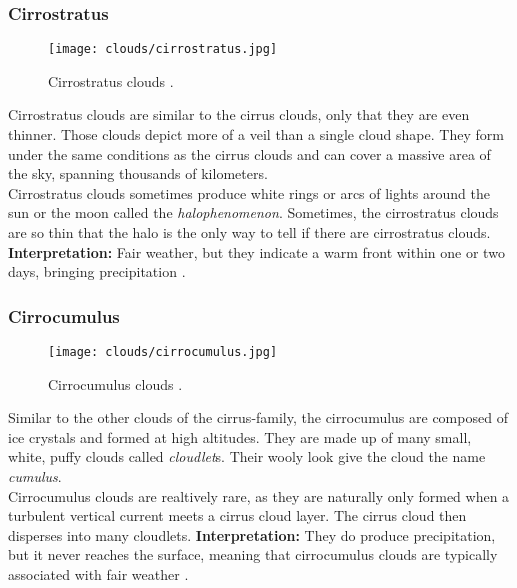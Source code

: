 \subsubsection{Cirrostratus}
\begin{wrapfigure}[10]{r}{6cm}
    \vspace{-\baselineskip}
    \texttt{[image: clouds/cirrostratus.jpg]}
    \caption{Cirrostratus clouds \protect\cite{cloudtypes:wiki:cirrostratus}.}
    \label{img:clouds:cirrostratus}
\end{wrapfigure}
Cirrostratus clouds are similar to the cirrus clouds, only that they are even thinner.
Those clouds depict more of a veil than a single cloud shape.
They form under the same conditions as the cirrus clouds and can cover a massive area of the sky, spanning thousands of kilometers.
\\
\noindent
Cirrostratus clouds sometimes produce white rings or arcs of lights around the sun or the moon called the \emph{\gls{halophenomenon}}.
Sometimes, the cirrostratus clouds are so thin that the halo is the only way to tell if there are cirrostratus clouds.
\emptyline
\textbf{Interpretation:} Fair weather, but they indicate a warm front within one or two days, bringing \gls{precipitation} \cite{cloudtypes:meteoblue}.

\subsubsection{Cirrocumulus}
\begin{wrapfigure}[10]{r}{6cm}
    \vspace{-\baselineskip}
    \texttt{[image: clouds/cirrocumulus.jpg]}
    \caption{Cirrocumulus clouds \protect\cite{cloudtypes:wiki:cirrocumulus}.}
    \label{img:clouds:cirrocumulus}
\end{wrapfigure}
Similar to the other clouds of the cirrus-family, the cirrocumulus are composed of ice crystals and formed at high \gls{altitude}s.
They are made up of many small, white, puffy clouds called \emph{\gls{cloudlet}}s. Their wooly look give the cloud the name \emph{cumulus}.
\\
\noindent
Cirrocumulus clouds are realtively rare, as they are naturally only formed when a turbulent vertical current meets a cirrus cloud layer. The cirrus cloud then disperses into many \gls{cloudlet}s.
\emptyline
\textbf{Interpretation:} 
They do produce \gls{precipitation}, but it never reaches the surface, meaning that cirrocumulus clouds are typically associated with fair weather \cite{cloudtypes:meteoblue}.

